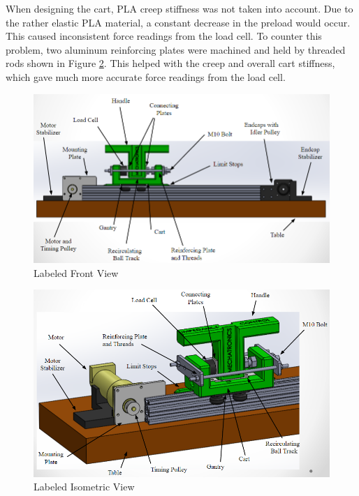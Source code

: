 When designing the cart, PLA creep stiffness was not taken into account. Due to the rather elastic PLA material, a constant decrease in the preload would occur. This caused inconsistent force readings from the load cell. To counter this problem, two aluminum reinforcing plates were machined and held by threaded rods shown in Figure \ref{fig:Annotated_Iso}. This helped with the creep and overall cart stiffness, which gave much more accurate force readings from the load cell.
\begin{figure}[H]
	\centering
	\includegraphics[width=1\linewidth]{Images/Annotated_Front}
	\caption{Labeled Front View}
	\label{fig:Annotated_Front}
\end{figure}
\begin{figure}[H]	
\centering
\includegraphics[width=1\linewidth]{Images/Annotated_Iso}
\caption{Labeled Isometric View}
\label{fig:Annotated_Iso}
\end{figure}
